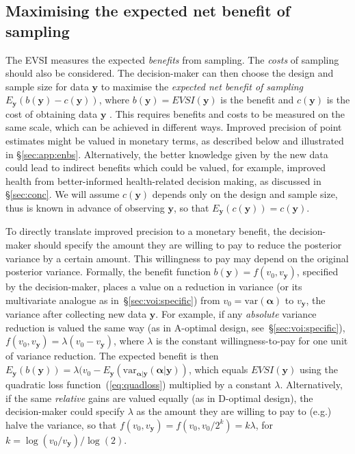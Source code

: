 \documentclass[12pt]{article}\usepackage[]{graphicx}\usepackage[]{color}
\newcommand{\var}{\mbox{var}}
\newcommand{\y}{\mathbf{y}}
\begin{document}
\subsection{Maximising the expected net benefit of sampling} 
\label{sec:enbs}
The EVSI measures the expected \emph{benefits} from sampling.  The \emph{costs} of sampling should also be considered.   The decision-maker can then choose the design and sample size for data $\y$ to maximise the \emph{expected net benefit of sampling} $E_\y(b(\y) - c(\y))$, where $b(\y)=EVSI(\y)$ is the benefit and $c(\y)$ is the cost of obtaining data $\y$ \citep{parmigiani2009decision}.    This requires benefits and costs to be measured on the same scale, which can be achieved in different ways.  Improved precision of point estimates might be valued in monetary terms, as described below and illustrated in \S\ref{sec:app:enbs}.    Alternatively, the better knowledge given by the new data could lead to indirect benefits which could be valued, for example, improved health from better-informed health-related decision making, as discussed in \S\ref{sec:conc}.  We will assume $c(\y)$ depends only on the design and sample size, thus is known in advance of observing $\y$, so that $E_\y(c(\y)) = c(\y)$.

To directly translate improved precision to a monetary benefit, the decision-maker should specify the amount they are willing to pay to reduce the posterior variance by a certain amount.   This willingness to pay may depend on the original posterior variance.  Formally, the benefit function $b(\y) = f(v_0, v_\y)$, specified by the decision-maker, places a value on a reduction in variance (or its multivariate analogue as in~\S\ref{sec:voi:specific}) from $v_0=\var(\bm\alpha)$ to $v_\y$, the variance after collecting new data $\y$. 
For example, if any \emph{absolute} variance reduction is valued the same way (as in A-optimal design, see~\S\ref{sec:voi:specific}), $f(v_0, v_\y) = \lambda (v_0 - v_\y)$, where $\lambda$ is the constant willingness-to-pay for one unit of variance reduction.   The expected benefit is then $E_\y(b(\y)) = \lambda(v_0 - E_\y(\var_{\bm\alpha|\y}(\bm\alpha|\y))$, which equals $EVSI(\y)$ using the quadratic loss function~(\ref{eq:quadloss}) multiplied by a constant $\lambda$.    Alternatively, if the same \emph{relative} gains are valued equally (as in D-optimal design), the decision-maker could specify $\lambda$ as the amount they are willing to pay to (e.g.) halve the variance, so that $f(v_0,v_\y) = f(v_0, v_0/2^k) = k\lambda$, for $k = \log(v_0/v_\y)/\log(2)$.
\end{document}
